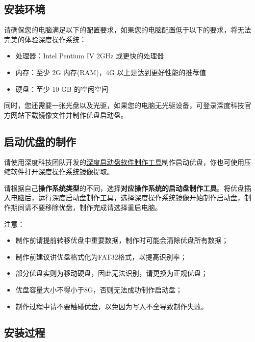 \documentclass[doctor,openright,twoside]{sjtuthesis}
\providecommand{\tightlist}{%
    \setlength{\itemsep}{0pt}\setlength{\parskip}{0pt}}
\theoremstyle{plain}
\theoremstyle{definition}
\theoremstyle{remark}
\theoremstyle{ocrenumbox}
\theoremstyle{plain}
\begin{document}
\hypertarget{section-17}{%
\subsection{安装环境}\label{section-17}}

请确保您的电脑满足以下的配置要求，如果您的电脑配置低于以下的要求，将无法完美的体验深度操作系统：

\begin{itemize}
\tightlist
\item
  处理器：Intel Pentium IV 2GHz 或更快的处理器
\item
  内存：至少 2G 内存(RAM)，4G 以上是达到更好性能的推荐值
\item
  硬盘：至少 10 GB 的空闲空间
\end{itemize}

同时，您还需要一张光盘以及光驱，如果您的电脑无光驱设备，可登录深度科技官方网站下载镜像文件并制作优盘启动盘。

\hypertarget{section-18}{%
\subsection{启动优盘的制作}\label{section-18}}

请使用深度科技团队开发的\href{https://www.deepin.org/original/deepin-boot-maker/}{深度启动盘软件制作工具}制作启动优盘，你也可使用压缩软件打开\href{https://www.deepin.org/download/}{深度操作系统镜像}提取。

请根据自己\textbf{操作系统类型}的不同，选择\textbf{对应操作系统的启动盘制作工具}。将优盘插入电脑后，运行深度启动盘制作工具，选择深度操作系统镜像开始制作启动盘，制作期间请不要移除优盘，制作完成请选择重启电脑。

注意：

\begin{itemize}
\tightlist
\item
  制作前请提前转移优盘中重要数据，制作时可能会清除优盘所有数据；
\item
  制作前建议讲优盘格式化为FAT32格式，以提高识别率；
\item
  部分优盘实则为移动硬盘，因此无法识别，请更换为正规优盘；
\item
  优盘容量大小不得小于8G，否则无法成功制作启动盘；
\item
  制作过程中请不要触碰优盘，以免因为写入不全导致制作失败。
\end{itemize}

\hypertarget{section-19}{%
\subsection{安装过程}\label{section-19}}
\end{document}
